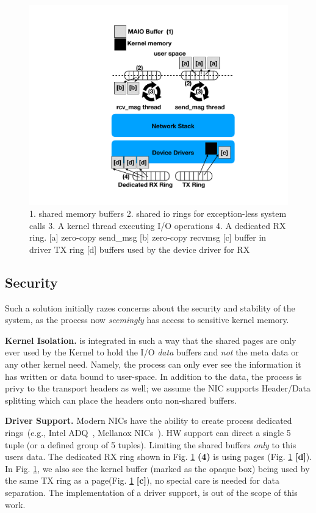 \begin{figure}[t]
    \centering
    \includegraphics[width=0.8\columnwidth]{ktcp_z.pdf}
    \caption{1. \oursys shared memory buffers 2. shared io rings for exception-less system calls 3. A kernel thread executing I/O operations 4. A dedicated RX ring.
    [a] zero-copy send\_msg [b] zero-copy recvmsg [c] \oursys buffer in driver TX ring [d] \oursys buffers used by the device driver for RX}
    \label{fig:our_sys}
\end{figure} 

\subsection{Security}
Such a solution initially razes concerns about the security and stability of the system, as the process now \emph{seemingly} has access to sensitive kernel memory. 

\noindent\textbf{Kernel Isolation.} \oursys is integrated in such a way that the shared pages are only ever used by the Kernel to hold the I/O \emph{data} buffers and \emph{not} the meta data or any other kernel need. Namely, the process can only ever see the information it has written or data bound to user-space. In addition to the data, the process is privy to the transport headers as well; we assume the NIC supports Header/Data splitting\cite{hds} which can place the headers onto non-shared buffers.

\noindent\textbf{Driver Support.} Modern NICs have the ability to create process dedicated rings~(e.g., Intel ADQ~\cite{adq}, Mellanox NICs~\cite{bifurcate}). HW support\cite{flow_direct} can direct a single 5 tuple (or a defined group of 5 tuples). Limiting the shared buffers \emph{only} to this users data. The dedicated RX ring shown in Fig. \ref{fig:our_sys} \textbf{(4)} is using \oursys pages (Fig. \ref{fig:our_sys} \textbf{[d]}). In Fig. \ref{fig:our_sys}, we also see the kernel buffer (marked as the opaque box) being used by the same TX ring as a \oursys page(Fig. \ref{fig:our_sys} \textbf{[c]}), no special care is needed for data separation. The implementation of a driver support, is out of the scope of this work. 

